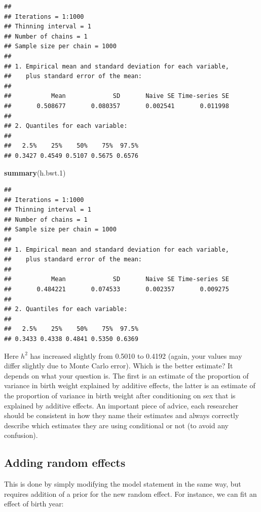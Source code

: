 \documentclass[
  12pt,
]{book}
\newenvironment{Shaded}{\begin{snugshade}}{\end{snugshade}}
\newcommand{\FloatTok}[1]{\textcolor[rgb]{0.00,0.00,0.81}{#1}}
\newcommand{\KeywordTok}[1]{\textcolor[rgb]{0.13,0.29,0.53}{\textbf{#1}}}
\newcommand{\NormalTok}[1]{#1}
\begin{document}
\begin{verbatim}
## 
## Iterations = 1:1000
## Thinning interval = 1 
## Number of chains = 1 
## Sample size per chain = 1000 
## 
## 1. Empirical mean and standard deviation for each variable,
##    plus standard error of the mean:
## 
##           Mean             SD       Naive SE Time-series SE 
##       0.508677       0.080357       0.002541       0.011998 
## 
## 2. Quantiles for each variable:
## 
##   2.5%    25%    50%    75%  97.5% 
## 0.3427 0.4549 0.5107 0.5675 0.6576
\end{verbatim}

\begin{Shaded}
\begin{Highlighting}[]
\KeywordTok{summary}\NormalTok{(h.bwt}\FloatTok{.1}\NormalTok{)}
\end{Highlighting}
\end{Shaded}

\begin{verbatim}
## 
## Iterations = 1:1000
## Thinning interval = 1 
## Number of chains = 1 
## Sample size per chain = 1000 
## 
## 1. Empirical mean and standard deviation for each variable,
##    plus standard error of the mean:
## 
##           Mean             SD       Naive SE Time-series SE 
##       0.484221       0.074533       0.002357       0.009275 
## 
## 2. Quantiles for each variable:
## 
##   2.5%    25%    50%    75%  97.5% 
## 0.3433 0.4338 0.4841 0.5350 0.6369
\end{verbatim}

Here \(h^2\) has increased slightly from 0.5010 to 0.4192 (again, your values may differ slightly due to Monte Carlo error). Which is the better estimate?
It depends on what your question is. The first is an estimate of the proportion of variance in birth weight explained by additive effects, the latter is an estimate of the proportion of variance in birth weight after conditioning on sex that is explained by additive effects.
An important piece of advice, each researcher should be consistent in how they name their estimates and always correctly describe which estimates they are using conditional or not (to avoid any confusion).

\hypertarget{adding-random-effects-2}{%
\subsection{Adding random effects}\label{adding-random-effects-2}}

This is done by simply modifying the model statement in the same way, but requires addition of a prior for the new random effect. For instance, we can fit an effect of birth year:
\end{document}
